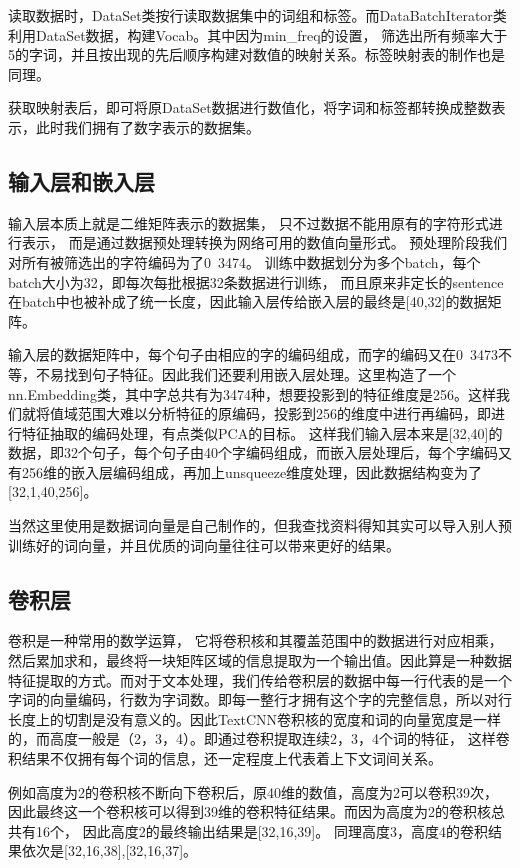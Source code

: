 \documentclass[11pt]{article}
\begin{document}
\begin{CJK*}{UTF8}{gbsn}
读取数据时，DataSet类按行读取数据集中的词组和标签。而DataBatchIterator类利用DataSet数据，构建Vocab。其中因为min\_freq的设置，
筛选出所有频率大于5的字词，并且按出现的先后顺序构建对数值的映射关系。标签映射表的制作也是同理。

获取映射表后，即可将原DataSet数据进行数值化，将字词和标签都转换成整数表示，此时我们拥有了数字表示的数据集。

\subsection{输入层和嵌入层}
\label{sect:pdf}

输入层本质上就是二维矩阵表示的数据集，
只不过数据不能用原有的字符形式进行表示，
而是通过数据预处理转换为网络可用的数值向量形式。
预处理阶段我们对所有被筛选出的字符编码为了0~3474。
训练中数据划分为多个batch，每个batch大小为32，即每次每批根据32条数据进行训练，
而且原来非定长的sentence在batch中也被补成了统一长度，因此输入层传给嵌入层的最终是[40,32]的数据矩阵。

输入层的数据矩阵中，每个句子由相应的字的编码组成，而字的编码又在0~3473不等，不易找到句子特征。因此我们还要利用嵌入层处理。这里构造了一个nn.Embedding类，其中字总共有为3474种，想要投影到的特征维度是256。这样我们就将值域范围大难以分析特征的原编码，投影到256的维度中进行再编码，即进行特征抽取的编码处理，有点类似PCA的目标。
这样我们输入层本来是[32,40]的数据，即32个句子，每个句子由40个字编码组成，而嵌入层处理后，每个字编码又有256维的嵌入层编码组成，再加上unsqueeze维度处理，因此数据结构变为了[32,1,40,256]。

当然这里使用是数据词向量是自己制作的，但我查找资料得知其实可以导入别人预训练好的词向量，并且优质的词向量往往可以带来更好的结果。
\subsection{卷积层}
\label{ssec:layout}
卷积是一种常用的数学运算， 它将卷积核和其覆盖范围中的数据进行对应相乘，
然后累加求和，最终将一块矩阵区域的信息提取为一个输出值。因此算是一种数据特征提取的方式。而对于文本处理，我们传给卷积层的数据中每一行代表的是一个字词的向量编码，行数为字词数。即每一整行才拥有这个字的完整信息，所以对行长度上的切割是没有意义的。因此TextCNN卷积核的宽度和词的向量宽度是一样的，而高度一般是（2，3，4）。即通过卷积提取连续2，3，4个词的特征，
这样卷积结果不仅拥有每个词的信息，还一定程度上代表着上下文词间关系。

例如高度为2的卷积核不断向下卷积后，原40维的数值，高度为2可以卷积39次，
因此最终这一个卷积核可以得到39维的卷积特征结果。而因为高度为2的卷积核总共有16个，
因此高度2的最终输出结果是[32,16,39]。
同理高度3，高度4的卷积结果依次是[32,16,38],[32,16,37]。


\end{CJK*}
\end{document}
